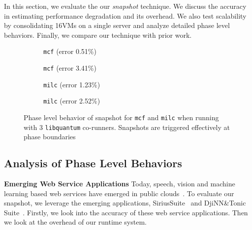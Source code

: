 \documentclass{sig-alternate}
\begin{document}
In this section, we evaluate the our \textit{snapshot} technique. We discuss the accuracy in estimating performance degradation and its overhead. We also test scalability by consolidating 16VMs on a single server and analyze detailed phase level behaviors. Finally, we compare our technique with prior work.
\begin{figure*}
\centering
\begin{subfigure}[t]{1\columnwidth}
\centering
{}
\caption{\texttt{mcf} (error 0.51\%)}
\label{fig:mcfsnapshotlib}
\end{subfigure}
\hfill
\begin{subfigure}[t]{1\columnwidth}
\centering
{}
\caption{\texttt{mcf} (error 3.41\%)}
\label{fig:mcfsnapshotmcf}
\end{subfigure}
\hfill
\begin{subfigure}[t]{1\columnwidth}
\centering
{}
\caption{\texttt{milc} (error 1.23\%)}
\label{fig:milcsnapshotlib}
\end{subfigure}
\hfill
\begin{subfigure}[t]{1\columnwidth}
\centering
{}
\caption{\texttt{milc} (error 2.52\%)}
\label{fig:milcsnapshotmcf}
\end{subfigure}
\caption{Phase level behavior of snapshot for \texttt{mcf} and \texttt{milc} when running with 3 \texttt{libquantum} co-runners. Snapshots are triggered effectively at phase boundaries}
\label{fig:mcfphase}
\end{figure*}
\subsection{Analysis of Phase Level Behaviors}
\label{subsec:AnalysisofPhaseLevelBehaviors}

\textbf{Emerging Web Service Applications}
Today, speech, vision and machine learning based web services have emerged in public clouds~\cite{awscase,pennamazon,docomo,pixnet}. To evaluate our snapshot, we leverage the emerging applications, SiriusSuite~\cite{sirius} and DjiNN\&Tonic Suite~\cite{djinn}. Firstly, we look into the accuracy of these web service applications. Then we look at the overhead of our runtime system.
\end{document}
